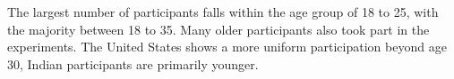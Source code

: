 \documentclass[10pt]{article}\usepackage[]{graphicx}\usepackage[]{color}
\begin{document}
%  


The largest number of participants falls within the age group of 18 to 25, with the majority between 18 to 35. Many older participants also took part in the experiments.%
The United States shows a more uniform participation beyond age 30, Indian participants are primarily younger. 
\end{document}
